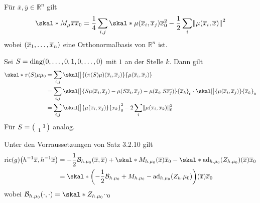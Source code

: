 \begin{lemma}[{name=[Formel mit der Momentenabbildung]}]
	Für $\overline{x}, \overline{y} \in \mathbb{R}^n$ gilt
	\[
		\skal*{M_\mu \overline{x}}{\overline{x}}_0 = \frac{1}{4} \sum_{i,j} \skal*{\mu(\overline{x}_i, \overline{x}_j)}{\overline{x}}_0^2 - \frac{1}{2} \sum_i \norm*{\mu(\overline{x}_i, \overline{x})}^2
	\]
	wobei $\enbrace*{\overline{x}_1, \ldots ,\overline{x}_n}$ eine Orthonormalbasis von $\mathbb{R}^n$ ist.
\end{lemma}
\begin{beweis}
	Sei $S = \diag(0, \ldots ,0, 1,0,\ldots ,0)$ mit $1$ an der Stelle $k$.
	Dann gilt
	\begin{align}
		\skal*{\pi(S) \mu}{\mu}_0 &= \sum_{i,j} \skal[\big]{\enbrace*{\pi(S)\mu} \enbrace*{\overline{x}_i, \overline{x}_j}}{\mu \enbrace*{\overline{x}_i, \overline{x}_j}} \\
		&= \sum_{i,j} \skal[\big]{S \mu \enbrace*{\overline{x}_i, \overline{x}_j} - \mu(S \overline{x}_i, \overline{x}_j) - \mu(\overline{x}_i, S \overline{x_j})}{\overline{x}_k}_0 \cdot \skal[\big]{\mu(\overline{x}_i, \overline{x}_j)}{\overline{x}_k}_0 \\
		&= \sum_{i,j} \skal[\big]{\mu \enbrace*{\overline{x}_i, \overline{x}_j}}{x_k}_0^2 - 2 \sum_i \norm*{\mu(\overline{x}_i, \overline{x}_k)}_0^2
	\end{align}
	Für $S = \begin{psmallmatrix}
		& & \\
		& & 1 \\
		& 1 &
	\end{psmallmatrix}$ analog.
\end{beweis}

\begin{satz}[{name=[Weitere Verbesserung der Formel für die Ricci-Krümmung]}]
	Unter den Vorraussetzungen von Satz 3.2.10 gilt
	\begin{align}
		\ric(g)\enbrace*{h^{-1} \overline{x},h^{-1} \overline{x}} &= -\frac{1}{2} \mathcal{B}_{h.\mu_0} (\overline{x},\overline{x}) + \skal*{M_{h.\mu_0}(\overline{x})}{\overline{x}}_0 - \skal*{\ad_{h.\mu_0}(Z_{h.\mu_0})(\overline{x})}{\overline{x}}_0 \\
		&= \skal*{\enbrace*{- \frac{1}{2} \mathcal{B}_{h.\mu_0} + M_{h.\mu_0} - \ad_{h.\mu_0}(Z_h.\mu_0)}(\overline{x})}{\overline{x}}_0
	\end{align}
	wobei $\mathcal{B}_{h.\mu_0}(\cdot ,\cdot ) = \skal*{Z_{h.\mu_0} \cdot }{\cdot }_0$
\end{satz}

